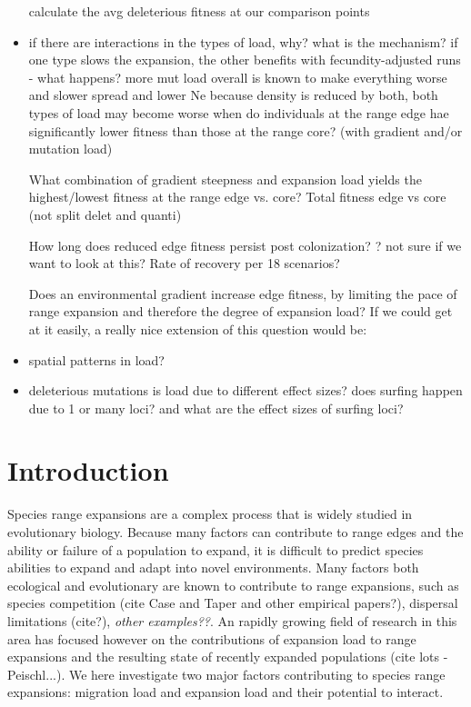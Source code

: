 \begin{itemize}
calculate the avg deleterious fitness at our comparison points

\item if there are interactions in the types of load, why? what is the mechanism?
if one type slows the expansion, the other benefits
with fecundity-adjusted runs - what happens?
more mut load overall is known to make everything worse and slower spread and lower Ne
because density is reduced by both, both types of load may become worse
when do individuals at the range edge hae significantly lower fitness than those at the range core? (with gradient and/or mutation load)

What combination of gradient steepness and expansion load yields the highest/lowest fitness at the range edge vs. core? 
	Total fitness edge vs core (not split delet and quanti)

How long does reduced edge fitness persist post colonization?
	? not sure if we want to look at this? Rate of recovery per 18 scenarios?

Does an environmental gradient increase edge fitness, by limiting the pace of range expansion and therefore the degree of expansion load?
If we could get at it easily, a really nice extension of this question would be: 

\item spatial patterns in load?

\item deleterious mutations
	is load due to different effect sizes?
	does surfing happen due to 1 or many loci?
	and what are the effect sizes of surfing loci?

\end{itemize}


\section{Introduction}

Species range expansions are a complex process that is widely studied in evolutionary biology. Because 
many factors can contribute to range edges and the ability or failure of a population to expand, it is 
difficult to predict species abilities to expand and adapt into novel environments. Many factors both ecological 
and evolutionary are known to contribute to range expansions, such as species competition (cite Case and Taper and other empirical papers?), 
dispersal limitations (cite?), \emph{other examples??}. An rapidly growing field of research in this area has focused however 
on the contributions of expansion load to range expansions and the resulting state of recently expanded populations (cite lots - Peischl...). 
We here investigate two major factors contributing to species range expansions: migration load and expansion load and their potential to interact.

